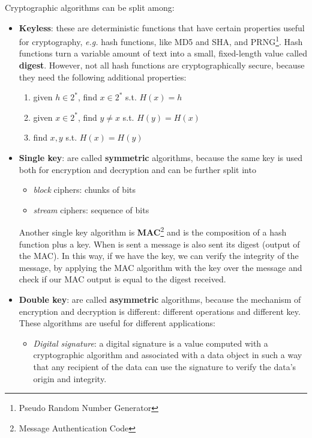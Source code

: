 \documentclass[oneside]{academica}
\begin{document}
Cryptographic algorithms can be split among:
\begin{itemize}
  \vspace{-5pt}
  \item \textbf{Keyless}: these are deterministic functions that have certain properties useful for cryptography, \textit{e.g.} hash functions, like MD5 and SHA, and PRNG\footnote{Pseudo Random Number Generator}.
    Hash functions turn a variable amount of text into a small, fixed-length value called \textbf{digest}.
    However, not all hash functions are cryptographically secure, because they need the following additional properties:
    \vspace{-5pt}
    \begin{enumerate}
      \item given $h \in 2^*$, find $x \in 2^*$ s.t. $H(x) = h$
      \item given $x \in 2^*$, find $y \neq x$ s.t. $H(y) = H(x)$
      \item find $x, y$ s.t. $H(x) = H(y)$
    \end{enumerate}
  \vspace{-5pt}
  \item \textbf{Single key}: are called \textbf{symmetric} algorithms, because the same key is used both for encryption and decryption and can be further split into
    \vspace{-5pt}
    \begin{itemize}
      \item \textit{block} ciphers: chunks of bits
      \item \textit{stream} ciphers: sequence of bits
    \end{itemize}
    Another single key algorithm is \textbf{MAC}\footnote{Message Authentication Code} and is the composition of a hash function plus a key.
    When is sent a message is also sent its digest (output of the MAC).
    In this way, if we have the key, we can verify the integrity of the message, by applying the MAC algorithm with the key over the message and check if our MAC output is equal to the digest received.
  \item \textbf{Double key}: are called \textbf{asymmetric} algorithms, because the mechanism of encryption and decryption is different: different operations and different key.
    These algorithms are useful for different applications:
    \begin{itemize}
      \item \textit{Digital signature}: a digital signature is a value computed with a cryptographic algorithm and associated with a data object in such a way that any recipient of the data can use the signature to verify the data’s origin and integrity.

\end{itemize}
\end{itemize}
\end{document}
